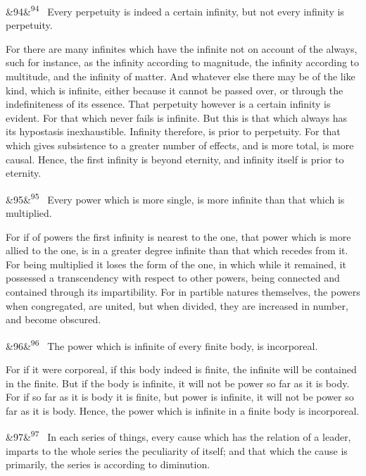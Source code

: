 \documentclass[12pt]{article}
\newcommand{\para}[1][]{\par\noindent\ifx&#1&\else\textsuperscript{\footnotesize #1}~\fi}
\begin{document}
\para[94] Every perpetuity is indeed a certain infinity, but not every infinity is perpetuity.

For there are many infinites which have the infinite not on account of the always, such for instance, as the infinity according to magnitude, the infinity according to multitude, and the infinity of matter. And whatever else there may be of the like kind, which is infinite, either because it cannot be passed over, or through the indefiniteness of its essence. That perpetuity however is a certain infinity is evident. For that which never fails is infinite. But this is that which always has its hypostasis inexhaustible. Infinity therefore, is prior to perpetuity. For that which gives subsistence to a greater number of effects, and is more total, is more causal. Hence, the first infinity is beyond eternity, and infinity itself is prior to eternity.

\para[95] Every power which is more single, is more infinite than that which is multiplied.

For if of powers the first infinity is nearest to the one, that power which is more allied to the one, is in a greater degree infinite than that which recedes from it. For being multiplied it loses the form of the one, in which while it remained, it possessed a transcendency with respect to other powers, being connected and contained through its impartibility. For in partible natures themselves, the powers when congregated, are united, but when divided, they are increased in number, and become obscured.

\para[96] The power which is infinite of every finite body, is incorporeal.

For if it were corporeal, if this body indeed is finite, the infinite will be contained in the finite. But if the body is infinite, it will not be power so far as it is body. For if so far as it is body it is finite, but power is infinite, it will not be power so far as it is body. Hence, the power which is infinite in a finite body is incorporeal.

\para[97] In each series of things, every cause which has the relation of a leader, imparts to the whole series the peculiarity of itself; and that which the cause is primarily, the series is according to diminution.
\end{document}
